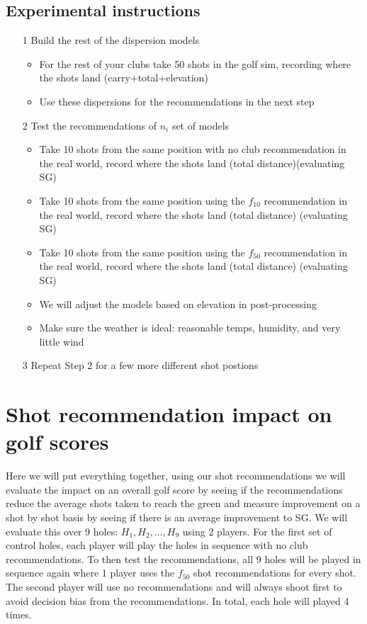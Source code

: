\documentclass{article}
\begin{document}
\subsection{Experimental instructions}
\begin{itemize}
	\item[1] Build the rest of the dispersion models 
		\begin{itemize}
			\item For the rest of your clubs take 50 shots in the golf sim, recording where the shots land (carry+total+elevation)
			\item Use these dispersions for the recommendations in the next step
		\end{itemize}
	\item[2] Test the recommendations of $n_i$ set of models 
		\begin{itemize}
			\item Take 10 shots from the same position with no club recommendation in the real world, record where the shots land (total distance)(evaluating SG)
			\item Take 10 shots from the same position using the $f_{10}$ recommendation in the real world, record where the shots land (total distance) (evaluating SG)
			\item Take 10 shots from the same position using the $f_{50}$ recommendation in the real world, record where the shots land (total distance) (evaluating SG)
			\item We will adjust the models based on elevation in post-processing
			\item Make sure the weather is ideal: reasonable temps, humidity, and very little wind
		\end{itemize}
	\item[3] Repeat Step 2 for a few more different shot postions
\end{itemize}

\section{Shot recommendation impact on golf scores}
Here we will put everything together, using our shot recommendations we will evaluate the impact on an overall golf score by seeing if the recommendations reduce the average shots taken to reach the green and measure improvement on a shot by shot basis by seeing if there is an average improvement to SG. We will evaluate this over 9 holes: ${H_1, H_2, \ldots, H_9}$ using 2 players. For the first set of control holes, each player will play the holes in sequence with no club recommendations. To then test the recommendations, all 9 holes will be played in sequence again where 1 player uses the $f_{50}$ shot recommendations for every shot. The second player will use no recommendations and will always shoot first to avoid decision bias from the recommendations. In total, each hole will played 4 times. 
\end{document}
